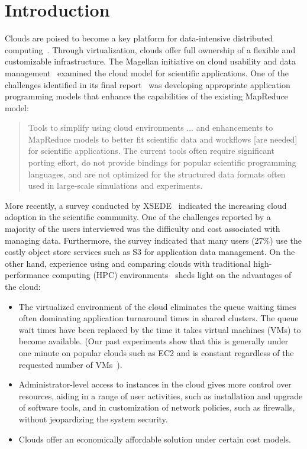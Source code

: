 \documentclass[10pt,journal,cspaper,compsoc]{IEEEtran}
\begin{document}
\IEEEpeerreviewmaketitle

\section{Introduction}

Clouds are poised to become a key platform for data-intensive distributed 
computing~\cite{cloudreq}. Through virtualization, clouds offer full ownership
of a flexible and customizable infrastructure. The Magellan
initiative on cloud usability and data management~\cite{magellan1} examined the
cloud model for scientific applications. One of the challenges identified in
its final report~\cite{magellan2} was developing appropriate application
programming models that enhance the capabilities of the existing MapReduce
model:

\begin{quote}
Tools to simplify using cloud environments ... and enhancements to
MapReduce models to better fit scientific data and workflows [are needed] for
scientific applications. The current tools often require significant porting
effort, do not provide bindings for popular scientific programming languages,
and are not optimized for the structured data formats often used in large-scale
simulations and experiments. 
\end{quote}

More recently, a survey conducted by XSEDE~\cite{xsede:cloudsurvey} indicated
the increasing cloud adoption in the scientific community. One of the
challenges reported by a majority of the users interviewed was the difficulty
and cost associated with managing data. Furthermore, the survey indicated that
many users (27\%) use the costly object store services such as S3 for
application data management. On the other hand, experience using and comparing
clouds with traditional high-performance computing (HPC)
environments~\cite{marathe, cloudvcluster} sheds light on the advantages of the
cloud:

\begin{itemize}
\item The virtualized environment of the cloud eliminates the queue waiting times
often dominating application turnaround times in shared clusters.
The queue wait times have been replaced by the time it takes virtual machines (VMs) to become
available. (Our past experiments show that this is generally under one minute
on popular clouds such as EC2 and is constant regardless of the requested
number of VMs~\cite{swift13}).

\item Administrator-level access to instances in the cloud gives more control over
resources, aiding in a range of user activities, such as installation and
upgrade of software tools, and in customization of network policies, such as
firewalls, without jeopardizing the system security.

\item Clouds offer an economically affordable solution under certain cost models. 
\end{itemize}
\end{document}
